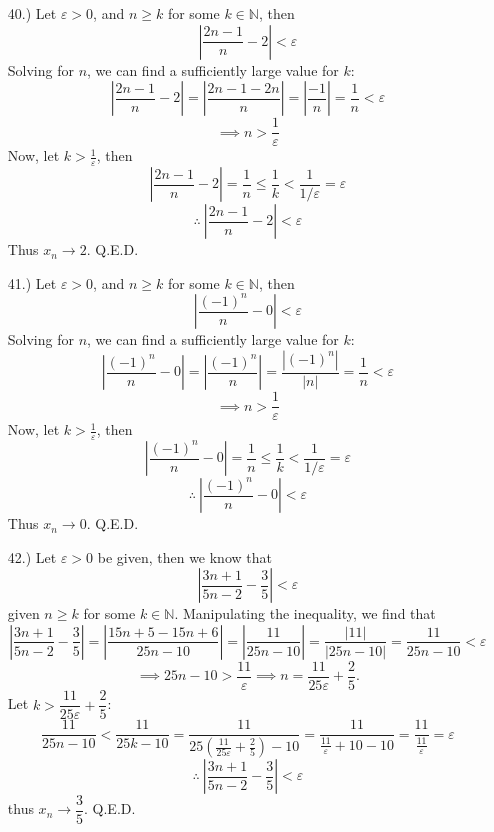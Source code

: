 \documentclass[12pt]{article}
\newcommand{\vertb}[1]{\left\vert#1\right\vert}
\newcommand{\parns}[1]{\left(#1\right)}
\newcommand{\e}{\varepsilon}
\begin{document}
\begin{itemize}
    \item [40.)] Let $\varepsilon>0$, and $n\geq k$ for some $k\in\mathbb{N}$, then
    \[\vertb{\frac{2n-1}{n}-2}<\varepsilon\]
    Solving for $n$, we can find a sufficiently large value for $k$:
    \[\vertb{\frac{2n-1}{n}-2}=\vertb{\frac{2n-1-2n}{n}}=\vertb{\frac{-1}{n}}=\frac{1}{n}<\varepsilon\]
    \[\implies n>\frac{1}{\varepsilon}\]
    Now, let $k>\frac{1}{\varepsilon}$, then
    \[\vertb{\frac{2n-1}{n}-2}=\frac{1}{n}\leq\frac{1}{k}<\frac{1}{1/\varepsilon}=\varepsilon\]
    \[\therefore\ \vertb{\frac{2n-1}{n}-2}<\varepsilon\]
    Thus $x_n\to2$. Q.E.D.

    \item [41.)] Let $\varepsilon>0$, and $n\geq k$ for some $k\in\mathbb{N}$, then
    \[\vertb{\frac{(-1)^n}{n}-0}<\varepsilon\]
    Solving for $n$, we can find a sufficiently large value for $k$:
    \[\vertb{\frac{(-1)^n}{n}-0}=\vertb{\frac{(-1)^n}{n}}=\frac{\vertb{(-1)^n}}{\vertb{n}}=\frac{1}{n}<\varepsilon\]
    \[\implies n>\frac{1}{\varepsilon}\]
    Now, let $k>\frac{1}{\varepsilon}$, then
    \[\vertb{\frac{(-1)^n}{n}-0}=\frac{1}{n}\leq\frac{1}{k}<\frac{1}{1/\varepsilon}=\varepsilon\]
    \[\therefore\ \vertb{\frac{(-1)^n}{n}-0}<\varepsilon\]
    Thus $x_n\to0$. Q.E.D.

    \item [42.)] Let $\e>0$ be given, then we know that
    \[\vertb{\frac{3n+1}{5n-2}-\frac{3}{5}}<\e\]
    given $n\geq k$ for some $k\in\mathbb{N}$. Manipulating the inequality, we find that
    \[\vertb{\frac{3n+1}{5n-2}-\frac{3}{5}}=\vertb{\frac{15n+5-15n+6}{25n-10}}=\vertb{\frac{11}{25n-10}}=\frac{\vertb{11}}{\vertb{25n-10}}=\frac{11}{25n-10}<\e\]
    \[\implies 25n-10>\frac{11}{\e}\implies n=\frac{11}{25\e}+\frac{2}{5}.\]
    Let $k>\dfrac{11}{25\e}+\dfrac{2}{5}$:
    \[\frac{11}{25n-10}<\frac{11}{25k-10}=\frac{11}{25\parns{\frac{11}{25\e}+\frac{2}{5}}-10}=\frac{11}{\frac{11}{\e}+10-10}=\frac{11}{\frac{11}{\e}}=\e\]
    \[\therefore\ \vertb{\frac{3n+1}{5n-2}-\frac{3}{5}}<\e\]
    thus $x_n\to\dfrac{3}{5}$. Q.E.D.







\end{itemize}
\end{document}
